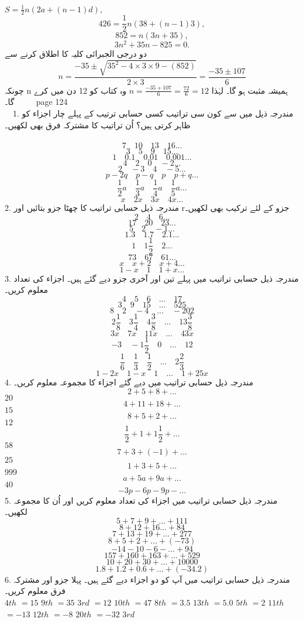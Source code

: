 \(S=\frac{1}{2}n(2a+(n-1)d),\)
\[426=\frac{1}{2}n(38+(n-1)3),\]
\[852=n(3n+35),\]
\[3n^{2}+35n-825=0.\]
دو درجی الجبرائی کلیہ کا اطلاق کرنے سے
\[n=\frac{-35\pm\sqrt{35^{2}-4\times3\times9-(852)}}{2\times3}=\frac{-35\pm107}{6}\]
چونکہ n ہمیشہ مثبت ہو گا۔ لہٰذا
\(n=\frac{-35+107}{6}=\frac{72}{6}=12\)
وہ کتاب کو 12 دن میں کرے گا۔
 \clearpage
 page 124\\
 1.	مندرجہ ذیل میں سے کون سی تراتیب کسی حسابی ترتیب کے پہلے چار اجزاء کو ظاہر کرتی ہیں؟ اُن تراتیب کا مشترکہ فرق بھی لکھیں۔\\
 \[7\quad10\quad13\quad16...\]
\[3\quad5\quad9\quad15...\]
\[1\quad0.1\quad0.01\quad0.001...\]
\[4\quad2\quad0\quad-2...\]
\[2\quad-3\quad4\quad-5...\]
\[p-2q\quad p-q\quad p\quad p+q...\]
\[\frac{1}{2}a\quad \frac{1}{3}a\quad \frac{1}{4}a\quad \frac{1}{5}a...\]
\[x\quad2x\quad3x\quad4x...\]
2.	مندرجہ ذیل حسابی تراتیب کا چھٹا جزو بتائیں اور rجزو کے لئے ترکیب بھی لکھیں۔\\
\[2\quad4\quad6...\]
\[17\quad20\quad23...\]
\[5\quad2\quad-1...\]
\[1.3\quad1.7\quad2.1...\]
\[1\quad1\frac{1}{2}\quad2...\]
\[73\quad67\quad61...\]
\[x\quad x+2\quad x+4...\]
\[1-x\quad1\quad1+x...\]
3.	مندرجہ ذیل حسابی تراتیب میں پہلے تین اور آخری جزو دیے گئے ہیں۔ اجزاء کی تعداد معلوم کریں۔\\
\[4\quad5\quad6\quad...\quad17\]
\[3\quad9\quad15\quad...\quad525\]
\[8\quad2\quad-4\quad...\quad-202\]
\[2\frac{1}{8}\quad3\frac{1}{4}\quad4\frac{3}{8}\quad...\quad13\frac{3}{8}\]
\[3x\quad7x\quad11x\quad...\quad43x\]
\[-3\quad-1\frac{1}{2}\quad0\quad...\quad12\]
\[\frac{1}{6}\quad\frac{1}{3}\quad\frac{1}{2}\quad...\quad2\frac{2}{3}\]
\[1-2x\quad1-x\quad1\quad...\quad1+25x\]
4.	مندرجہ ذیل حسابی تراتیب میں دیے گئے اجزاء کا مجموعہ معلوم کریں۔\\
\[2+5+8+...\]
\(20\)
\[4+11+18+...\]
\(15\)
\[8+5+2+...\]
\(12\)
\[\frac{1}{2}+1+1\frac{1}{2}+...\]
\(58\)
\[7+3+(-1)+...\]
\(25\)
\[1+3+5+...\]
\(999\)
\[a+5a+9a+...\]
\(40\)
\[-3p-6p-9p-...\]
5.	مندرجہ ذیل حسابی تراتیب میں اجزاء کی تعداد معلوم کریں اور اُن کا مجموعہ لکھیں۔\\
\[5+7+9+...+111\]
\[8+12+16...+84\]
\[7+13+19+...+277\]
\[8+5+2+...+(-73)\]
\[-14-10-6-...+94\]
\[157+160+163+...+529\]
\[10+20+30+...+10000\]
\[1.8+1.2+0.6+...+(-34.2)\]
6.	مندرجہ ذیل حسابی تراتیب میں آپ کو دو اجزاء دیے گئے ہیں۔ پہلا جزو اور مشترکہ فرق معلوم کریں۔\\
\(4th\)
\(=15\)
\(9th\)
\(=35\)
\(3rd\)
\(=12\)
\(10th\)
\(=47\)
\(8th\)
\(=3.5\)
\(13th\)
\(=5.0\)
\(5th\)
\(=2\)
\(11th\)
\(=-13\)
\(12th\)
\(=-8\)
\(20th\)
\(=-32\)
\(3rd\)

